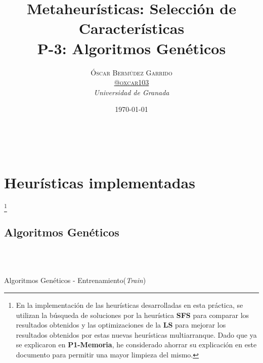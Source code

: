 \documentclass[a4paper, 11pt]{article}
\title{\textbf{Metaheurísticas: Selección de Características}\\ %
P-3: Algoritmos Genéticos} %
\author{\textsc{Óscar Bermúdez Garrido\\
\href{http://www.github.com/oxcar103}{@oxcar103}} %
\\{\textit{Universidad de Granada}}} %
\date{\today} %
\makeatletter
\renewcommand{\maketitle}{
  \begin{flushright} %
  {\LARGE\@title} %
  
  \vspace{50pt} %
  
  {\large\@author} %
  \\\@date %
  \vspace{40pt} %
  \end{flushright}
}
\makeatother
\begin{document}
\maketitle %

\renewcommand{\abstractname}{Resumen} %



{\parskip=2pt
  \tableofcontents
}
\pagebreak

	
	
	
	\section{Heurísticas implementadas}\footnote{En la implementación de las heurísticas desarrolladas
	en esta práctica, se utilizan la búsqueda de soluciones por la heurística \textbf{SFS} para comparar
	los resultados obtenidos y las optimizaciones de la \textbf{LS} para mejorar los resultados obtenidos
	por estas nuevas heurísticas multiarranque. Dado que ya se explicaron en \textbf{P1-Memoria}, he
	considerado ahorrar su explicación en este documento para permitir una mayor limpieza del mismo.}
	
		\subsection{Algoritmos Genéticos}
			\begin{algorithm}[H]
				\begin{algorithmic}[1]
				\REQUIRE \ \\
						 \
			 
					\ENDIF
				\ENDFOR
				
					\ENDFOR
				\ENDWHILE
				
				\end{algorithmic}
			\caption{Algoritmos Genéticos - Entrenamiento(\textit{Train})}
			\label{GA-Train}
			\end{algorithm}
			
\end{document}
